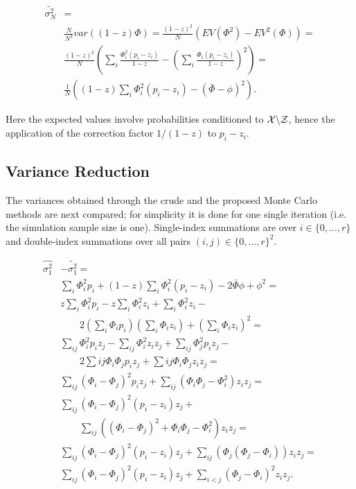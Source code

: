 \documentclass[a4paper]{article}
\begin{document}
\begin{equation*} \label{eq:variance-bmc} \begin{split} \widetilde{\sigma^2_N} & = \\
	& \frac{N}{N^2}var\left((1-z)\Phi\right) = \frac{(1-z)^2}{N} \left(EV(\Phi^2)-EV^2(\Phi)\right) =  \\
	& \frac{(1-z)^2}{N} \left( \sum_i\frac{\Phi_i^2(p_i-z_i)}{1-z} - \left( \sum_i\frac{\Phi_i(p_i-z_i)}{1-z} \right)^2 \right) =  \\
	& \frac{1}{N}\left((1-z)\sum_i\Phi_i^2(p_i-z_i)-(\bar{\Phi}-\phi)^2\right).
\end{split} \end{equation*}

Here the expected values involve probabilities conditioned to ${\cal X}{\setminus}{\cal Z}$, hence the application of the correction factor $1/(1-z)$ to $p_i-z_i$.

\subsection{Variance Reduction}

The variances obtained through the crude and the proposed Monte Carlo methods are next compared; for simplicity it is done for one single iteration (i.e. the simulation sample size is one). Single-index summations are over $i \in \{0,\dots,r\}$ and double-index summations over all pairs $(i,j) \in \{0,\dots,r\}^2$.

\begin{equation*} \label{eq:varred} \begin{split}
\widehat{\sigma^2_1} & - \widetilde{\sigma^2_1} = \\
& \sum_i\Phi_i^2p_i + (1-z)\sum_i\Phi_i^2(p_i-z_i) - 2\bar{\Phi}\phi+\phi^2 = \\
& z\sum_i\Phi_i^2p_i-z\sum_i\Phi_i^2z_i+\sum_i\Phi_i^2z_i - \\
	& \qquad 2(\sum_i\Phi_ip_i)(\sum_i\Phi_iz_i) + (\sum_i\Phi_iz_i)^2 = \\
& \sum_{ij}\Phi_i^2p_iz_j - \sum_{ij}\Phi_i^2z_iz_j + \sum_{ij}\Phi_j^2p_iz_j - \\ 
	& \qquad 2\sum{ij}\Phi_i\Phi_jp_iz_j + \sum{ij}\Phi_i\Phi_jz_iz_j = \\
& \sum_{ij}(\Phi_i-\Phi_j)^2p_iz_j + \sum_{ij}(\Phi_i\Phi_j-\Phi_i^2)z_iz_j = \\
& \sum_{ij}(\Phi_i-\Phi_j)^2(p_i-z_i)z_j + \\
	& \qquad \sum_{ij}\left((\Phi_i-\Phi_j)^2+\Phi_i\Phi_j-\Phi_i^2\right)z_iz_j = \\
& \sum_{ij}(\Phi_i-\Phi_j)^2(p_i-z_i)z_j + \sum_{ij}(\Phi_j(\Phi_j-\Phi_i))z_iz_j = \\
& \sum_{ij}(\Phi_i-\Phi_j)^2(p_i-z_i)z_j + \sum_{i<j}(\Phi_j-\Phi_i)^2z_iz_j.
\end{split} \end{equation*}
\end{document}
